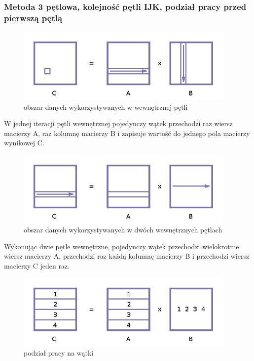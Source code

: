 \documentclass[12pt,a4paper]{article}
\begin{document}
\subsubsection{Metoda 3 pętlowa, kolejność pętli IJK, podział pracy przed pierwszą pętlą}

\begin{figure}[H]
  \centering
    \includegraphics[width=0.95\textwidth]{IJK_K.jpg}
    \caption{obszar danych wykorzystywanych w wewnętrznej pętli}
\end{figure}

W jednej iteracji pętli wewnętrznej pojedynczy wątek przechodzi raz wiersz macierzy A, raz kolumnę macierzy B i zapisuje wartość do jednego pola macierzy wynikowej C.

\begin{figure}[H]
  \centering
    \includegraphics[width=0.95\textwidth]{IJK_KJ.jpg}
    \caption{obszar danych wykorzystywanych w dwóch wewnętrznych pętlach}
\end{figure}

Wykonując dwie pętle wewnętrzne, pojedynczy wątek przechodzi wielokrotnie wiersz macierzy A, przechodzi raz każdą kolumnę macierzy B i przechodzi wiersz macierzy C jeden raz.

\begin{figure}[H]
  \centering
    \includegraphics[width=0.95\textwidth]{IJK_KJI.jpg}
    \caption{podział pracy na wątki}
\end{figure}
\end{document}
